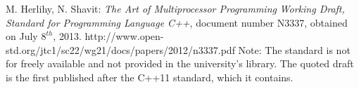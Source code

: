 \documentclass[a4paper,10pt]{article}
\begin{document}
\pagebreak

\begin{thebibliography}{9}
    M. Herlihy, N. Shavit:
   \emph{The Art of Multiprocessor Programming}
	\emph{Working Draft, Standard for Programming Language C++},
	document number N3337, obtained on July $8^{th}$, 2013.	
	http://www.open-std.org/jtc1/sc22/wg21/docs/papers/2012/n3337.pdf
	\newline
	Note: The standard is not for freely available and not provided in the university's  library. The quoted draft is the first published after the C++11 standard, which it contains.

\end{thebibliography}
\end{document}
